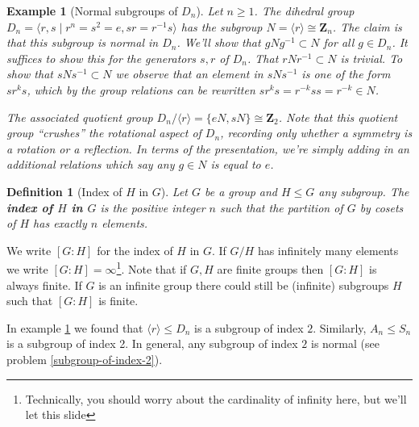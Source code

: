 \documentclass[12pt]{article}
\numberwithin{equation}{subsection}
\newtheorem{defn}[subsection]{Definition}
\theoremstyle{note}
\newtheorem{example}[subsection]{Example}
\begin{document}
\begin{example}[Normal subgroups of $D_n$] \label{ex-Dn-normal} Let $n\geq 1$. The dihedral group $D_n=\langle r, s \mid r^n=s^2=e, sr=r^{-1}s\rangle$ has the subgroup $N=\langle r\rangle \cong \mathbf{Z}_n$. The claim is that this subgroup is normal in $D_n$. We'll show that $gNg^{-1}\subset N$ for all $g\in D_n$. It suffices to show this for the generators $s,r$ of $D_n$. That $rNr^{-1}\subset N$ is trivial. To show that $sNs^{-1}\subset N$ we observe that an element in $sNs^{-1}$ is one of the form $sr^ks$, which by the group relations can be rewritten $sr^ks=r^{-k}ss=r^{-k}\in N$. 
	
	The associated quotient group $D_n/\langle r\rangle= \{eN, sN\}\cong \mathbf{Z}_2$. Note that this quotient group ``crushes'' the rotational aspect of $D_n$, recording only whether a symmetry is a rotation or a reflection. In terms of the presentation, we're simply adding in an additional relations which say any $g\in N$ is equal to $e$. 
\end{example}


\begin{defn}[Index of $H$ in $G$]
Let $G$ be a group and $H\leq G$ any subgroup. The \textbf{index of $H$ in $G$} is the positive integer $n$ such that the partition of $G$ by cosets of $H$ has exactly $n$ elements. 
\end{defn}
We write $[G:H]$ for the index of $H$ in $G$. If $G/H$ has infinitely many elements we write $[G:H]=\infty$\footnote{Technically, you should worry about the cardinality of infinity here, but we'll let this slide}. Note that if $G,H$ are finite groups then $[G:H]$ is always finite. If $G$ is an infinite group there could still be (infinite) subgroups $H$ such that $[G:H]$ is finite. 

In example \ref{ex-Dn-normal} we found that $\langle r\rangle \leq D_n$ is a subgroup of index $2$. Similarly, $A_n\leq S_n$ is a subgroup of index 2. In general, any subgroup of index $2$ is normal (see problem \ref{subgroup-of-index-2}). 


\end{document}

